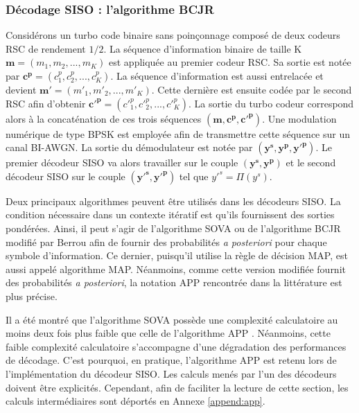 %
	
	

\subsubsection{Décodage SISO : l'algorithme BCJR}\label{sec:BCJR}
Considérons un turbo code binaire sans poinçonnage composé de deux codeurs RSC de rendement $1/2$. La séquence d'information binaire de taille K $\mathbf{m} = (m_1, m_2, ..., m_K)$ est appliquée au premier codeur RSC. Sa sortie est notée par $\mathbf{c^p} = (c^p_1, c^p_2, ..., c^p_K)$. La séquence d'information est aussi entrelacée et devient $\mathbf{m'} = (m'_1, m'_2, ..., m'_K)$. Cette dernière est ensuite codée par le second RSC afin d'obtenir $\mathbf{c'^p} = (c'^p_1, c'^p_2, ..., c'^p_K)$. La sortie du turbo codeur correspond alors à la concaténation de ces trois séquences $(\mathbf{m}, \mathbf{c^p}, \mathbf{c'^p})$. Une modulation numérique de type BPSK est employée afin de transmettre cette séquence sur un canal BI-AWGN. La sortie du démodulateur est notée par $(\mathbf{y^s},\mathbf{y^p},\mathbf{y'^p})$. Le premier décodeur SISO va alors travailler sur le couple $(\mathbf{y^s},\mathbf{y^p})$ et le second décodeur SISO sur le  couple $(\mathbf{y'^s},\mathbf{y'^p})$ tel que $y'^s = \Pi(y^s)$.

Deux principaux algorithmes peuvent être utilisés dans les décodeurs SISO. La condition nécessaire dans un contexte itératif est qu'ils fournissent des sorties pondérées. Ainsi, il peut s'agir de l'algorithme SOVA ou de l'algorithme BCJR modifié par Berrou \cite{berrouTC} afin de fournir des probabilités \textit{a posteriori} pour chaque symbole d'information. Ce dernier, puisqu'il utilise la règle de décision MAP, est aussi appelé  algorithme MAP. Néanmoins, comme cette version modifiée fournit des probabilités \textit{a posteriori}, la notation APP rencontrée dans la littérature est plus précise.

Il a été montré que l'algorithme SOVA possède une complexité calculatoire au moins deux fois plus faible que celle de l'algorithme APP \cite{robertson1995comparison}. Néanmoins, cette faible complexité calculatoire s'accompagne d'une dégradation des performances de décodage. C'est pourquoi, en pratique, l'algorithme APP est retenu lors de l'implémentation du décodeur SISO. Les calculs menés par l'un des décodeurs doivent être explicités. Cependant, afin de faciliter la lecture de cette section, les calculs intermédiaires sont déportés en Annexe \ref{append:app}.

